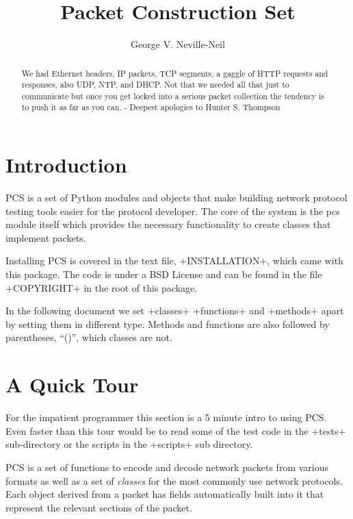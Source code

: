 \documentclass[11pt]{article}
\title{Packet Construction Set}
\author{George V. Neville-Neil}
\begin{document}
\maketitle
\tableofcontents
\begin{abstract}
  We had Ethernet headers, IP packets, TCP segments, a gaggle of HTTP
  requests and responses, also UDP, NTP, and DHCP. Not that we needed
  all that just to communicate but once you get locked into a serious
  packet collection the tendency is to push it as far as you can. -
  Deepest apologies to Hunter S. Thompson
\end{abstract}
\section{Introduction}

PCS is a set of Python modules and objects that make building network
protocol testing tools easier for the protocol developer.  The core of
the system is the pcs module itself which provides the necessary
functionality to create classes that implement packets.

Installing PCS is covered in the text file, \file+INSTALLATION+, which came
with this package.  The code is under a BSD License and can be found
in the file \file+COPYRIGHT+ in the root of this package.

In the following document we set \class+classes+ 
\function+functions+ and \method+methods+ apart by setting them in
different type.  Methods and functions are also followed by
parentheses, ``()'', which classes are not.


\section{A Quick Tour}

For the impatient programmer this section is a 5 minute intro to using
PCS.  Even faster than this tour would be to read some of the test
code in the \file+tests+ sub-directory or the scripts in the
\file+scripts+ sub directory.

PCS is a set of functions to encode and decode network packets from
various formats as well as a set of \emph{classes} for the most
commonly use network protocols.  Each object derived from a packet has
fields automatically built into it that represent the relevant
sections of the packet.  
\end{document}
